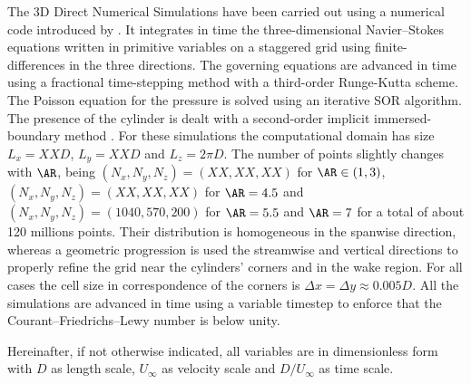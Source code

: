The 3D Direct Numerical Simulations have been carried out using a numerical code introduced by \cite{luchini-2013}. It integrates in time the three-dimensional Navier--Stokes equations written in primitive variables on a staggered grid using finite-differences in the three directions. The governing equations are advanced in time using a fractional time-stepping method with a third-order Runge-Kutta scheme. The Poisson equation for the pressure is solved using an iterative SOR algorithm. The presence of the cylinder is dealt with a second-order implicit immersed-boundary method \citep{luchini-etal-2025}. For these simulations the computational domain has size $L_x=XXD$, $L_y=XXD$ and $L_z=2\pi D$. The number of points slightly changes with $\AR$, being $(N_x,N_y,N_z) = (XX,XX,XX)$ for $\AR \in (1,3)$, $(N_x,N_y,N_z)=(XX,XX,XX)$ for $\AR =4.5$ and$(N_x,N_y,N_z)=(1040,570,200)$ for $\AR=5.5 $ and $\AR=7$ for a total of about 120 millions points. Their distribution is homogeneous in the spanwise direction, whereas a geometric progression is used the streamwise and vertical directions to properly refine the grid near the cylinders' corners and in the wake region. For all cases the cell size in correspondence of the corners is $\Delta x = \Delta y \approx 0.005D$. All the simulations are advanced in time using a variable timestep to enforce that the Courant–Friedrichs–Lewy number is below unity. 

Hereinafter, if not otherwise indicated, all variables are in dimensionless form with $D$ as length scale, $U_\infty$ as velocity scale and $D/U_\infty$ as time scale.
